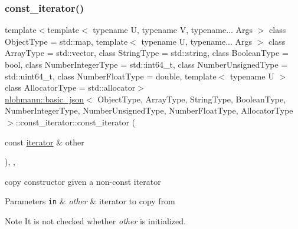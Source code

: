 \subsubsection{\texorpdfstring{const\+\_\+iterator()}{const\_iterator()}\hspace{0.1cm}{\footnotesize\ttfamily [2/3]}}
{\footnotesize\ttfamily template$<$template$<$ typename U, typename V, typename... Args $>$ class Object\+Type = std\+::map, template$<$ typename U, typename... Args $>$ class Array\+Type = std\+::vector, class String\+Type  = std\+::string, class Boolean\+Type  = bool, class Number\+Integer\+Type  = std\+::int64\+\_\+t, class Number\+Unsigned\+Type  = std\+::uint64\+\_\+t, class Number\+Float\+Type  = double, template$<$ typename U $>$ class Allocator\+Type = std\+::allocator$>$ \\
\hyperlink{classnlohmann_1_1basic__json}{nlohmann\+::basic\+\_\+json}$<$ Object\+Type, Array\+Type, String\+Type, Boolean\+Type, Number\+Integer\+Type, Number\+Unsigned\+Type, Number\+Float\+Type, Allocator\+Type $>$\+::const\+\_\+iterator\+::const\+\_\+iterator (\begin{DoxyParamCaption}\item[{const \hyperlink{classnlohmann_1_1basic__json_1_1iterator}{iterator} \&}]{other }\end{DoxyParamCaption})\hspace{0.3cm}{\ttfamily [inline]}, {\ttfamily [explicit]}, {\ttfamily [noexcept]}}



copy constructor given a non-\/const iterator 


\begin{DoxyParams}[1]{Parameters}
\mbox{\tt in}  & {\em other} & iterator to copy from \\
\hline
\end{DoxyParams}
\begin{DoxyNote}{Note}
It is not checked whether {\itshape other} is initialized. 
\end{DoxyNote}
\mbox{\label{classnlohmann_1_1basic__json_1_1const__iterator_a18c35a6735d3da96b4fc026421c05dd8}} 

